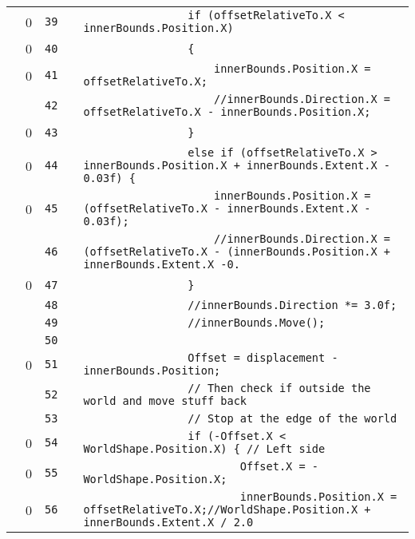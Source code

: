 \documentclass[a4paper,landscape,10pt]{article}
\begin{document}
\begin{longtable}[l]{lrrll}
\cellcolor{red} & 0 & \verb~39~ & & \verb~                if (offsetRelativeTo.X < innerBounds.Position.X)~\\
\cellcolor{red} & 0 & \verb~40~ & & \verb~                {~\\
\cellcolor{red} & 0 & \verb~41~ & & \verb~                    innerBounds.Position.X = offsetRelativeTo.X;~\\
\cellcolor{gray} &  & \verb~42~ & & \verb~                    //innerBounds.Direction.X = offsetRelativeTo.X - innerBounds.Position.X;~\\
\cellcolor{red} & 0 & \verb~43~ & & \verb~                }~\\
\cellcolor{red} & 0 & \verb~44~ & & \verb~                else if (offsetRelativeTo.X > innerBounds.Position.X + innerBounds.Extent.X - 0.03f) {~\\
\cellcolor{red} & 0 & \verb~45~ & & \verb~                    innerBounds.Position.X = (offsetRelativeTo.X - innerBounds.Extent.X - 0.03f);~\\
\cellcolor{gray} &  & \verb~46~ & & \verb~                    //innerBounds.Direction.X = (offsetRelativeTo.X - (innerBounds.Position.X + innerBounds.Extent.X -0.~\\
\cellcolor{red} & 0 & \verb~47~ & & \verb~                }~\\
\cellcolor{gray} &  & \verb~48~ & & \verb~                //innerBounds.Direction *= 3.0f;~\\
\cellcolor{gray} &  & \verb~49~ & & \verb~                //innerBounds.Move();~\\
\cellcolor{gray} &  & \verb~50~ & & \verb~~\\
\cellcolor{red} & 0 & \verb~51~ & & \verb~                Offset = displacement - innerBounds.Position;~\\
\cellcolor{gray} &  & \verb~52~ & & \verb~                // Then check if outside the world and move stuff back~\\
\cellcolor{gray} &  & \verb~53~ & & \verb~                // Stop at the edge of the world~\\
\cellcolor{red} & 0 & \verb~54~ & & \verb~                if (-Offset.X < WorldShape.Position.X) { // Left side~\\
\cellcolor{red} & 0 & \verb~55~ & & \verb~                        Offset.X = -WorldShape.Position.X;~\\
\cellcolor{red} & 0 & \verb~56~ & & \verb~                        innerBounds.Position.X = offsetRelativeTo.X;//WorldShape.Position.X + innerBounds.Extent.X / 2.0~\\

\end{longtable}
\end{document}
